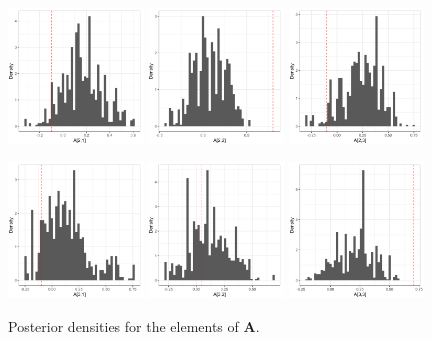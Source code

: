 \begin{figure}[H]
    \includegraphics[width=0.32\textwidth]{../figures/post_A21.png}
    \includegraphics[width=0.32\textwidth]{../figures/post_A22.png}
    \includegraphics[width=0.32\textwidth]{../figures/post_A23.png}
    
    \includegraphics[width=0.32\textwidth]{../figures/post_A31.png}
    \includegraphics[width=0.32\textwidth]{../figures/post_A32.png}
    \includegraphics[width=0.32\textwidth]{../figures/post_A33.png}
    \caption{Posterior densities for the elements of $\mathbf{A}$.}
\end{figure}

